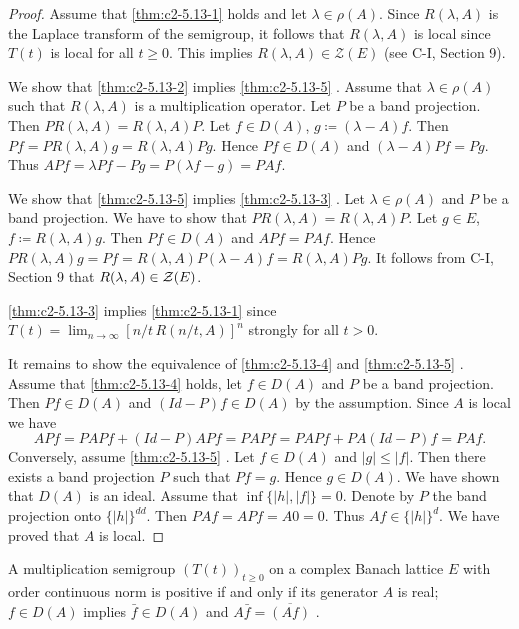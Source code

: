 \begin{proof}
Assume that \ref{thm:c2-5.13-1}   holds and let $\lambda \in \rho(A)$.
Since $R(\lambda,A)$ is the Laplace transform of the semigroup, it follows that $R(\lambda,A)$ is local since $T(t)$ is local for all $t \geq 0$.
This implies $R(\lambda,A) \in \mathcal{Z}(E)$ (see C-I, Section 9).

We show that \ref{thm:c2-5.13-2}   implies \ref{thm:c2-5.13-5}  .
Assume that $\lambda \in \rho(A)$ such that $R(\lambda,A)$ is a multiplication operator.
Let $P$ be a band projection.
Then $PR(\lambda,A) = R(\lambda,A)P$.
Let $f \in D(A)$, $g \coloneqq (\lambda-A)f$.
Then $Pf = PR(\lambda,A)g = R(\lambda,A)Pg$.
Hence $Pf \in D(A)$ and $(\lambda-A)Pf = Pg$.
Thus $APf= \lambda Pf - Pg = P(\lambda f - g) = PAf$.

We show that \ref{thm:c2-5.13-5}   implies \ref{thm:c2-5.13-3}  .
Let $\lambda \in \rho(A)$ and $P$ be a band projection.
We have to show that $PR(\lambda,A) = R(\lambda,A)P$.
Let $g \in E$, $f \coloneqq R(\lambda,A)g$.
Then $Pf \in D(A)$ and $APf = PAf$.
Hence $PR(\lambda,A)g = Pf = R(\lambda,A)P(\lambda-A)f = R(\lambda,A)Pg$.
It follows from C-I, Section 9 
that $R(\lambda,A) \in \mathcal{Z}(E)$.

 \ref{thm:c2-5.13-3}   implies  \ref{thm:c2-5.13-1}   since $T(t) = \lim_{n \to \infty} [n/t\,R(n/t,A)]^{n}$ strongly for all $t > 0$.

It remains to show the equivalence of  \ref{thm:c2-5.13-4}   and  \ref{thm:c2-5.13-5}  .
Assume that  \ref{thm:c2-5.13-4}   holds, let $f \in D(A)$ and $P$ be a band projection.
Then $Pf \in D(A)$ and $(Id-P)f \in D(A)$ by the assumption.
Since $A$ is local we have 
\[
APf = PAPf + (Id-P)APf = PAPf = PAPf + PA(Id-P)f = PAf.
\]
Conversely, assume  \ref{thm:c2-5.13-5}  .
Let $f \in D(A)$ and $|g| \leq |f|$.
Then there exists a band projection $P$ such that $Pf = g$.
Hence $g \in D(A)$.
We have shown
that $D(A)$ is an ideal.
Assume that $\inf\{|h|,|f|\} = 0$.
Denote by $P$ the band projection onto $\{|h|\}^{dd}$.
Then $PAf = APf = A0 = 0$.
Thus $Af \in \{|h|\}^{d}$.
We have proved that $A$ is local.
\end{proof}


\begin{corollary}\label{cor:c2-5.14}
%
%
%
A multiplication semigroup $(T(t))_{t \geq 0}$ on a complex Banach lattice $E$ with order continuous norm is positive if and only if its generator $A$ is real; \ie $f \in D(A)$ implies $\bar{f} \in D(A)$ and $A\bar{f} = \overline{(Af)}$ .
\end{corollary}

